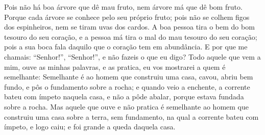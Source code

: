 {  Pois não há boa árvore que dê mau fruto, nem árvore má que dê bom fruto.
  Porque cada árvore se conhece pelo seu próprio fruto; pois não se colhem figos dos espinheiros, nem se tiram uvas dos cardos.
  A boa pessoa tira o bem do bom tesouro do seu coração, e a pessoa má tira o mal do mau tesouro do seu coração; pois a sua boca fala daquilo que o coração tem em abundância.
  E por que me chamais: “Senhor!”, “Senhor!”, e não fazeis o que eu digo?
  Todo aquele que vem a mim, ouve as minhas palavras, e as pratica, eu vos mostrarei a quem é semelhante:
  Semelhante é ao homem que construiu uma casa, cavou, abriu bem fundo, e pôs o fundamento sobre a rocha; e quando veio a enchente, a corrente bateu com ímpeto naquela casa, e não a pôde abalar, porque estava fundada sobre a rocha.
  Mas aquele que ouve e não pratica é semelhante ao homem que construiu uma casa sobre a terra, sem fundamento, na qual a corrente bateu com ímpeto, e logo caiu; e foi grande a queda daquela casa.
\par }

